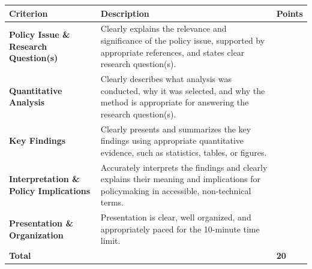 \documentclass[
]{article}
\begin{document}
\begin{longtable}[]{@{}
  >{\raggedright\arraybackslash}p{}
  >{\raggedright\arraybackslash}p{}
  >{\raggedleft\arraybackslash}p{}@{}}
\toprule\noalign{}
\begin{minipage}[b]{\linewidth}\raggedright
Criterion
\end{minipage} & \begin{minipage}[b]{\linewidth}\raggedright
Description
\end{minipage} & \begin{minipage}[b]{\linewidth}\raggedleft
Points
\end{minipage} \\
\midrule\noalign{}
\endhead
\bottomrule\noalign{}
\endlastfoot
\textbf{Policy Issue \& Research Question(s)} & Clearly explains the
relevance and significance of the policy issue, supported by appropriate
references, and states clear research question(s). & 4 \\
\textbf{Quantitative Analysis} & Clearly describes what analysis was
conducted, why it was selected, and why the method is appropriate for
answering the research question(s). & 5 \\
\textbf{Key Findings} & Clearly presents and summarizes the key findings
using appropriate quantitative evidence, such as statistics, tables, or
figures. & 4 \\
\textbf{Interpretation \& Policy Implications} & Accurately interprets
the findings and clearly explains their meaning and implications for
policymaking in accessible, non-technical terms. & 4 \\
\textbf{Presentation \& Organization} & Presentation is clear, well
organized, and appropriately paced for the 10-minute time limit. & 3 \\
\textbf{Total} & & \textbf{20} \\
\end{longtable}
\end{document}

